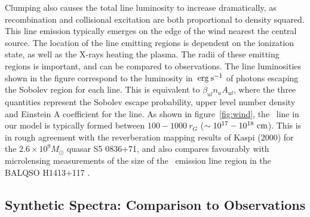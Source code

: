 \documentclass[useAMS,usenatbib]{mn2e_x}
\begin{document}
Clumping also causes the total line luminosity to increase dramatically,
as recombination and collisional excitation are both proportional to
density squared. This line emission typically emerges on the edge of the wind
nearest the central source. The location of the line emitting regions
is dependent on the ionization state, as well as the X-rays heating the plasma.
The radii of these emitting regions is important,
and can be compared to observations. The line luminosities 
shown in the figure correspond to the luminosity in $\:{\rm erg\:s^{-1}}$ of photons
escaping the Sobolev region for each line. 
This is equivalent to $\beta_{ul} n_u A_{ul}$, where the three quantities
represent the Sobolev escape probability, upper level number density and 
Einstein A coefficient for the line. 
As shown in figure~\ref{fig:wind},
the \civ\ line in our model is typically formed between 
$100-1000~r_G$ ($\sim10^{17}-10^{18}~\rm{cm}$).
This is in rough agreement with the reverberation mapping 
results of Kaspi (2000) for the $2.6\times10^{9} M_\odot$ quasar S5 0836+71,
and also compares favourably with microlensing measurements of the size of the
\civ\ emission line region in the BALQSO H1413+117 \citep{odowd2015}.


\subsection{Synthetic Spectra: Comparison to Observations}
\end{document}
